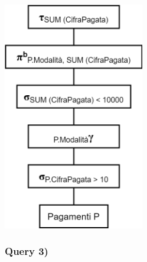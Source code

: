 \documentclass[a4paper,12pt]{article}
\begin{document}
\begin{minipage}{\textwidth}
\begin{multicols}{2}

\null \vfill

\vfill \null

\columnbreak

\includegraphics[height=10cm]{ Albero logico 2.png }
\end{multicols}
\end{minipage}

 \subsubsection{ Query 3) }
\end{document}

